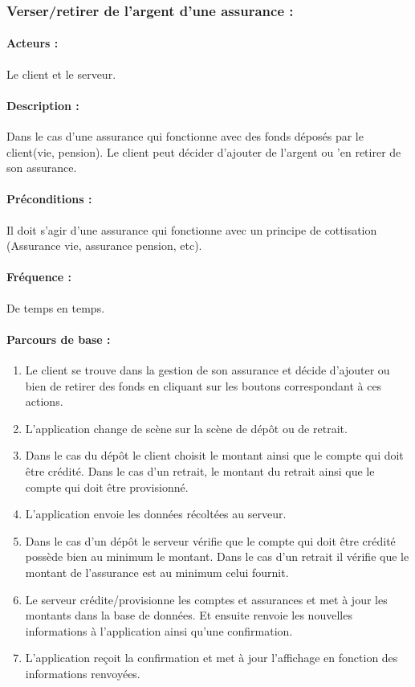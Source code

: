 \documentclass[../annexe.tex]{subfiles}
\begin{document}
\newpage

\subsubsection{Verser/retirer de l'argent d'une assurance :}

\paragraph{Acteurs :}
		Le client et le serveur.
\paragraph{Description :}
		Dans le cas d'une assurance qui fonctionne avec des fonds déposés par le client(vie, pension). Le client peut décider d'ajouter de l'argent ou 'en retirer de son
		assurance.
\paragraph{Préconditions :}
		Il doit s'agir d'une assurance qui fonctionne avec un principe de cottisation (Assurance vie, assurance pension, etc).
\paragraph{Fréquence :}
		De temps en temps.
\paragraph{Parcours de base :}
		\begin{enumerate}
				\item Le client se trouve dans la gestion de son assurance et décide d'ajouter ou bien de retirer des fonds en cliquant sur les boutons correspondant à ces actions.
				\item L'application change de scène sur la scène de dépôt ou de retrait.
				\item Dans le cas du dépôt le client choisit le montant ainsi que le compte qui doit être crédité. Dans le cas d'un retrait, le montant du retrait ainsi que le compte
						qui doit être provisionné.
				\item L'application envoie les données récoltées au serveur.
				\item Dans le cas d'un dépôt le serveur vérifie que le compte qui doit être crédité possède bien au minimum le montant. Dans le cas d'un retrait il vérifie que le montant
						de l'assurance est au minimum celui fournit.
				\item Le serveur crédite/provisionne les comptes et assurances et met à jour les montants dans la base de données. Et ensuite renvoie les nouvelles informations à l'application
						ainsi qu'une confirmation.
				\item L'application reçoit la confirmation et met à jour l'affichage en fonction des informations renvoyées.
		\end{enumerate}
\end{document}
